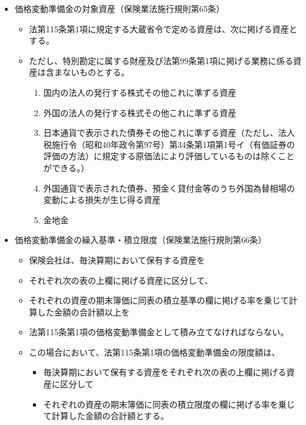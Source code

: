 \documentclass[report,gutter=10mm,fore-edge=10mm,uplatex,dvipdfmx]{jlreq}
\begin{document}

\begin{itemize}
\tightlist
\item
  価格変動準備金の対象資産（保険業法施行規則第65条）

  \begin{itemize}
  \tightlist
  \item
    法第115条第1項に規定する大蔵省令で定める資産は、次に掲げる資産とする。
  \item
    ただし、特別勘定に属する財産及び法第99条第1項に掲げる業務に係る資産は含まないものとする。

    \begin{enumerate}
    \tightlist
    \item
      国内の法人の発行する株式その他これに準ずる資産
    \item
      外国の法人の発行する株式その他これに準ずる資産
    \item
      日本通貨で表示された債券その他これに準ずる資産（ただし、法人税施行令（昭和40年政令第97号）第34条第1項第1号イ（有価証券の評価の方法）に規定する原価法により評価しているものは除くことができる。）
    \item
      外国通貨で表示された債券、預金く貸付金等のうち外国為替相場の変動による損失が生じ得る資産
    \item
      金地金
    \end{enumerate}
  \end{itemize}
\item
  価格変動準備金の繰入基準・積立限度（保険業法施行規則第66条）

  \begin{itemize}
  \tightlist
  \item
    保険会社は、毎決算期において保有する資産を
  \item
    それぞれ次の表の上欄に掲げる資産に区分して、
  \item
    それぞれの資産の期末簿価に同表の積立基準の欄に掲げる率を乗じて計算した金額の合計額以上を
  \item
    法第115条第1項の価格変動準備金として積み立てなければならない。
  \item
    この場合において、法第115条第1項の価格変動準備金の限度額は、

    \begin{itemize}
    \tightlist
    \item
      毎決算期において保有する資産をそれぞれ次の表の上欄に掲げる資産に区分して
    \item
      それぞれの資産の期末簿価に同表の積立限度の欄に掲げる率を乗じて計算した金額の合計額とする。
    \end{itemize}
  \end{itemize}
\end{itemize}
\end{document}
